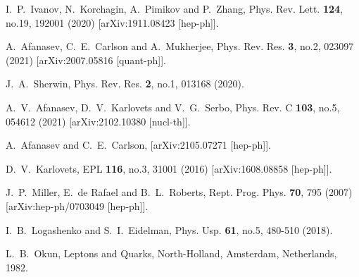 \documentclass[aps,prd,longbibliography,nofootinbib,amsthm,amsmath,amssymb,amsfonts,notitlepage]{revtex4-1}
\begin{document}
\begin{thebibliography}{99}
I.~P.~Ivanov, N.~Korchagin, A.~Pimikov and P.~Zhang,
Phys. Rev. Lett. \textbf{124}, no.19, 192001 (2020)
[arXiv:1911.08423 [hep-ph]].

A.~Afanasev, C.~E.~Carlson and A.~Mukherjee,
Phys. Rev. Res. \textbf{3}, no.2, 023097 (2021)
[arXiv:2007.05816 [quant-ph]].

J.~A.~Sherwin,
Phys. Rev. Res. \textbf{2}, no.1, 013168 (2020).

A.~V.~Afanasev, D.~V.~Karlovets and V.~G.~Serbo,
Phys. Rev. C \textbf{103}, no.5, 054612 (2021)
[arXiv:2102.10380 [nucl-th]].

A.~Afanasev and C.~E.~Carlson,
[arXiv:2105.07271 [hep-ph]].

D.~V.~Karlovets,
EPL \textbf{116}, no.3, 31001 (2016)
[arXiv:1608.08858 [hep-ph]].

J.~P.~Miller, E.~de Rafael and B.~L.~Roberts,
Rept. Prog. Phys. \textbf{70}, 795 (2007)
[arXiv:hep-ph/0703049 [hep-ph]].

I.~B.~Logashenko and S.~I.~Eidelman,
Phys. Usp. \textbf{61}, no.5, 480-510 (2018).


L.~B.~Okun, Leptons and Quarks, North-Holland, Amsterdam, Netherlands, 1982.


\end{thebibliography}
\end{document}
